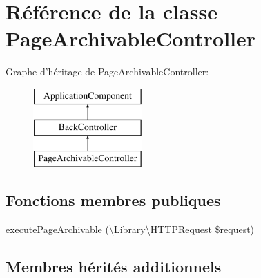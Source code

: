 \hypertarget{class_applications_1_1_frontend_1_1_modules_1_1_page_archivable_1_1_page_archivable_controller}{\section{Référence de la classe Page\+Archivable\+Controller}
\label{class_applications_1_1_frontend_1_1_modules_1_1_page_archivable_1_1_page_archivable_controller}
}
Graphe d'héritage de Page\+Archivable\+Controller\+:\begin{figure}[H]
\begin{center}
\leavevmode
\includegraphics[height=3.000000cm]{class_applications_1_1_frontend_1_1_modules_1_1_page_archivable_1_1_page_archivable_controller}
\end{center}
\end{figure}
\subsection*{Fonctions membres publiques}
\begin{DoxyCompactItemize}
\item 
\hyperlink{class_applications_1_1_frontend_1_1_modules_1_1_page_archivable_1_1_page_archivable_controller_a1132d17c1bf545df6729ca1ebbbc47f7}{execute\+Page\+Archivable} (\textbackslash{}\hyperlink{class_library_1_1_h_t_t_p_request}{Library\textbackslash{}\+H\+T\+T\+P\+Request} \$request)
\end{DoxyCompactItemize}
\subsection*{Membres hérités additionnels}


